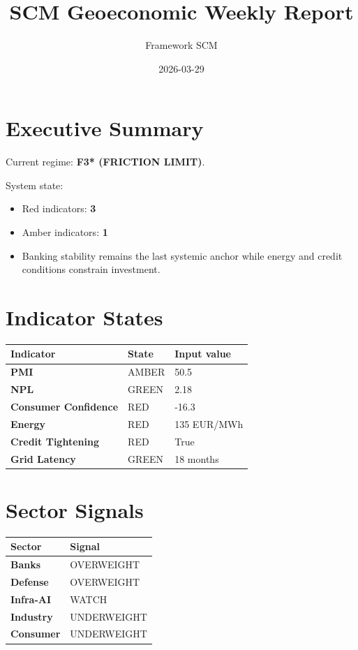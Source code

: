 \documentclass[11pt,a4paper]{article}
\title{SCM Geoeconomic Weekly Report}
\author{Framework SCM}
\date{2026-03-29}
\begin{document}
\maketitle

\section*{Executive Summary}
Current regime: \textbf{F3* (FRICTION LIMIT)}.

System state:
\begin{itemize}
  \item Red indicators: \textbf{3}
  \item Amber indicators: \textbf{1}
  \item Banking stability remains the last systemic anchor while energy and credit conditions constrain investment.
\end{itemize}

\section*{Indicator States}
\begin{longtable}{>{\bfseries}p{4cm}p{4cm}p{5cm}}
\toprule
Indicator & State & Input value \\
\midrule
PMI & AMBER & 50.5 \\
NPL & GREEN & 2.18 \\
Consumer Confidence & RED & -16.3 \\
Energy & RED & 135 EUR/MWh \\
Credit Tightening & RED & True \\
Grid Latency & GREEN & 18 months \\
\bottomrule
\end{longtable}

\section*{Sector Signals}
\begin{longtable}{>{\bfseries}p{5cm}p{6cm}}
\toprule
Sector & Signal \\
\midrule
Banks & OVERWEIGHT \\
Defense & OVERWEIGHT \\
Infra-AI & WATCH \\
Industry & UNDERWEIGHT \\
Consumer & UNDERWEIGHT \\
\bottomrule
\end{longtable}
\end{document}
